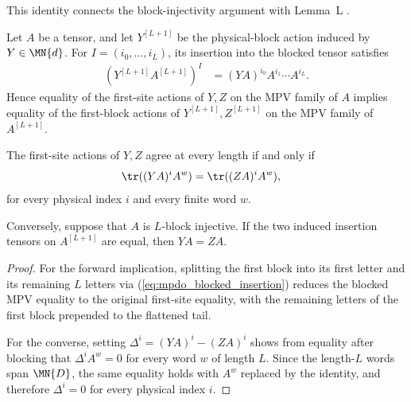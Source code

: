 \begin{lemma}
    \label{lem:first_site_action_physical_blocking}
    \leanok
    This identity connects the block-injectivity argument
    \cite[lines~318--345]{Cirac2016MPDO_arXiv} with Lemma~L
    \cite[Appendix~C.3, lines~1835--1858]{Cirac2016MPDO_arXiv}.

    Let $A$ be a tensor, and let $Y^{[L+1]}$ be the physical-block action
    induced by $Y\in\MN{d}$. For $I=(i_0,\ldots,i_L)$, its insertion into
    the blocked tensor satisfies
    \begin{align}
        (Y^{[L+1]}A^{[L+1]})^I
         & =(YA)^{i_0}A^{i_1}\cdots A^{i_L}.
        \label{eq:mpdo_blocked_insertion}
    \end{align}
    Hence equality of the first-site actions of $Y,Z$ on the MPV family of
    $A$ implies equality of the first-block actions of
    $Y^{[L+1]},Z^{[L+1]}$ on the MPV family of $A^{[L+1]}$.

    The first-site actions of $Y,Z$ agree at every length if and only if
    \begin{align}
        \tr((YA)^i A^w)
         & =\tr((ZA)^i A^w),
        \label{eq:mpdo_marked_first_site_trace}
    \end{align}
    for every physical index $i$ and every finite word $w$.

    Conversely, suppose that $A$ is $L$-block injective. If the two induced
    insertion tensors on $A^{[L+1]}$ are equal, then $YA=ZA$.
\end{lemma}

\begin{proof}
    \leanok
    For the forward implication, splitting the first block into its first
    letter and its remaining $L$ letters via
    (\ref{eq:mpdo_blocked_insertion}) reduces the blocked MPV equality to the
    original first-site equality, with the remaining letters of the first
    block prepended to the flattened tail.

    For the converse, setting $\Delta^i=(YA)^i-(ZA)^i$ shows from equality
    after blocking that $\Delta^i A^w=0$ for every word $w$ of length $L$.
    Since the length-$L$ words span $\MN{D}$, the same equality holds with
    $A^w$ replaced by the identity, and therefore $\Delta^i=0$ for every
    physical index $i$.
\end{proof}

